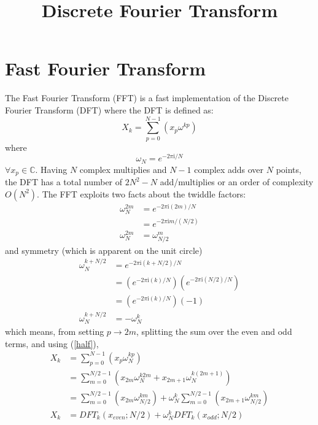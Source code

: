 \documentclass{article}
\begin{document}
%
\title{Discrete Fourier Transform}
%
\maketitle
%
\section {Fast Fourier Transform}
%
The Fast Fourier Transform (FFT) is a fast implementation of the Discrete Fourier Transform (DFT) where the DFT is defined as:
%
\begin {equation} \label {eq:dft}
X_k = \sum_{p = 0}^{N-1} (x_p \omega^{k p})
\end {equation}
%
where
%
\begin {equation} \label {eq:twiddle}
\omega_N = e^{-2 \pi \mathrm {i} / N}
\end {equation}
%
$\forall x_p \in \mathbb {C}$. Having $N$ complex multiplies and $N-1$ complex adds over $N$ points, the DFT has a total number of $2 N^2 - N$ add/multiplies or an order of complexity $O(N^2)$. The FFT exploits two facts about the twiddle factors:
%
\begin {equation} \label {half}
\begin {aligned}
\omega_N^{2m} &= e^{-2 \pi \mathrm {i} (2m) / N}    \\
              &= e^{-2 \pi \mathrm {i} m / (N / 2)} \\
\omega_N^{2m} &= \omega_{N/2}^m
\end {aligned}
\end {equation}
%
and symmetry (which is apparent on the unit circle)
%
\begin {equation} \label {symmetry}
\begin {aligned}
\omega_N^{k + N/2} &= e^{-2 \pi \mathrm {i} (k + N/2) / N} \\
             &= \left (e^{-2 \pi \mathrm {i} (k) / N} \right) \left (e^{-2 \pi \mathrm {i} (N/2) / N} \right) \\
             &= \left (e^{-2 \pi \mathrm {i} (k) / N} \right) \left (-1 \right) \\
\omega_N^{k + N/2} &= -\omega_{N}^{k}
\end {aligned}
\end {equation}
%
which means, from setting $p \rightarrow 2m$, splitting the sum over the even and odd terms, and using (\ref{half}),
%
\begin {equation} \label {eq:xk}
\begin {aligned}
X_k &= \sum_{p = 0}^{N-1} (x_p \omega_N^{k p}) \\
    &= \sum_{m = 0}^{N/2-1} (x_{2m} \omega_N^{k 2 m} + x_{2m+1} \omega_N^{k (2 m + 1)}) \\
    &= \sum_{m = 0}^{N/2-1} (x_{2m} \omega_{N/2}^{k m}) + \omega_N^{k} \sum_{m = 0}^{N/2-1} (x_{2m+1} \omega_{N/2}^{km}) \\
X_k &= DFT_k(x_{even}; N/2) + \omega_N^{k} DFT_k(x_{odd}; N/2)
\end {aligned}
\end {equation}
\end{document}
